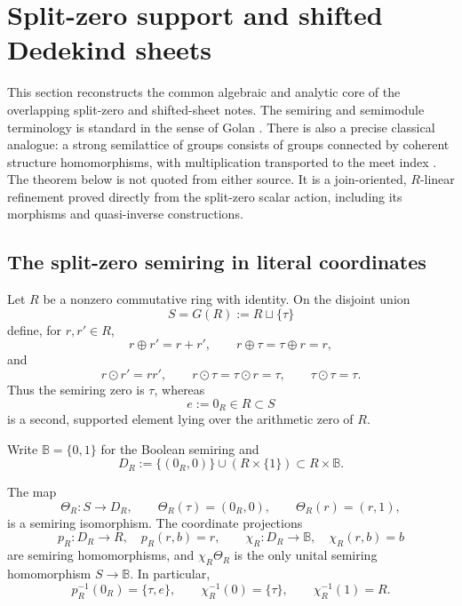 \section{Split-zero support and shifted Dedekind sheets}
\label{sec:gcue-audited-core}

This section reconstructs the common algebraic and analytic core of the overlapping
split-zero and shifted-sheet notes.  The semiring and semimodule terminology is standard
in the sense of Golan \cite[Chap.~17, pp.~191--202]{golan1999}.  There is also a precise
classical analogue: a strong semilattice of groups consists of groups connected by coherent
structure homomorphisms, with multiplication transported to the meet index
\cite[\S9.1, pp.~183--184, Thm.~9.1.6]{knauer2011}.  The theorem below is not quoted from
either source.  It is a join-oriented, $R$-linear refinement proved directly from the
split-zero scalar action, including its morphisms and quasi-inverse constructions.

\subsection{The split-zero semiring in literal coordinates}

Let $R$ be a nonzero commutative ring with identity.  On the disjoint union
\[
 S=G(R):=R\sqcup\{\tau\}
\]
define, for $r,r'\in R$,
\[
 r\oplus r'=r+r',\qquad r\oplus\tau=\tau\oplus r=r,
\]
and
\[
 r\odot r'=rr',\qquad r\odot\tau=\tau\odot r=\tau,
 \qquad \tau\odot\tau=\tau.
\]
Thus the semiring zero is $\tau$, whereas
\[
 e:=0_R\in R\subset S
\]
is a second, supported element lying over the arithmetic zero of $R$.

Write $\mathbb B=\{0,1\}$ for the Boolean semiring and
\[
 D_R:=\{(0_R,0)\}\cup(R\times\{1\})\subset R\times\mathbb B.
\]

\begin{proposition}
\label{prop:gcue-coordinate-support}
The map
\[
 \Theta_R:S\longrightarrow D_R,
 \qquad
 \Theta_R(\tau)=(0_R,0),\qquad \Theta_R(r)=(r,1),
\]
is a semiring isomorphism.  The coordinate projections
\[
 p_R:D_R\to R,\quad p_R(r,b)=r,
 \qquad
 \chi_R:D_R\to\mathbb B,\quad\chi_R(r,b)=b
\]
are semiring homomorphisms, and $\chi_R\Theta_R$ is the only unital semiring
homomorphism $S\to\mathbb B$.  In particular,
\[
 p_R^{-1}(0_R)=\{\tau,e\},\qquad
 \chi_R^{-1}(0)=\{\tau\},\qquad
 \chi_R^{-1}(1)=R.
\]
\end{proposition}

